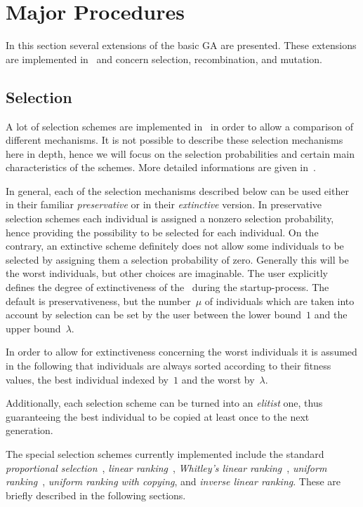 %
%

\section{Major Procedures}\label{genesis-pro}

In this section several extensions of the  basic GA are presented.
These extensions are implemented in \GEN\ and concern selection,
recombination, and mutation.

\subsection{Selection}\label{selection}

A lot of selection schemes are implemented in \GEN\ in order to allow
a comparison of different mechanisms.
It is not possible to describe these selection mechanisms here in depth,
hence we will focus on the selection probabilities and certain
main characteristics of the schemes.
More detailed informations are given in~\cite{BH91c}.

In general, each of the selection mechanisms described below can be
used either in their familiar {\em preservative\/} or in their
{\em extinctive\/} version.
In preservative selection schemes each individual is assigned a nonzero
selection probability, hence providing the possibility to be selected 
for each individual.
On the contrary, an extinctive scheme definitely does not allow some
individuals to be selected by assigning them a selection probability
of zero.
Generally this will be the worst individuals, but other choices are imaginable.
The user explicitly defines the degree of extinctiveness of the \GA\ 
during the startup-process.
The default is preservativeness, but the number~$\mu$ of individuals
which are taken into account by selection can be set by the user
between the lower bound~$1$ and the upper bound~$\lambda$.

In order to allow for extinctiveness concerning the worst individuals
it is assumed in the following that individuals are always sorted according
to their fitness values, the best individual indexed by~$1$ and the 
worst by~$\lambda$.

Additionally, each selection scheme can be turned into an {\em elitist\/}
one, thus guaranteeing the best individual to be copied at least once 
to the next generation.

The special selection schemes currently implemented include the
standard {\em proportional selection\/}~\cite{Hol75},
{\em linear ranking\/}~\cite{Bak85}, 
{\em Whitley's linear ranking\/}~\cite{Whi89},
{\em uniform ranking\/}~\cite{Schw81}, 
{\em uniform ranking with copying\/}, and {\em inverse linear ranking\/}.
These are briefly described in the following sections.

